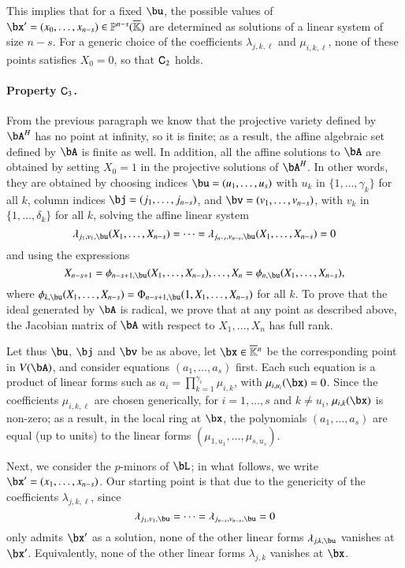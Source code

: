\documentclass[amsthm]{elsart}
\begin{document}
This implies that for a fixed $\bu$, the possible values of $\bx'=(x_0,\dots,x_{n-s}) \in \P^{n-s}(\KKbar)$ are
determined as solutions of a linear system of size $n-s$. For a
generic choice of the coefficients $\lambda_{j,k,\ell}$ and
$\mu_{i,k,\ell}$, none of these points satisfies $X_0=0$, so that
$\mathsf{C}_2$ holds.

\paragraph*{Property $\mathsf{C}_3$.} From the previous paragraph we know that
the projective variety defined by $\bA^\mH$ has no point at infinity,
so it is finite; as a result, the affine algebraic set defined by
$\bA$ is finite as well. In addition, all the affine solutions to
$\bA$ are obtained by setting $X_0=1$ in the projective solutions of
$\bA^\mH$. In other words, they are obtained by choosing indices
$\bu=(u_1,\dots,u_s)$ with $u_k$ in $\{1,\dots,\gamma_k\}$ for all $k$,
column indices $\bj=(j_1,\dots,j_{n-s})$, and
$\bv=(v_1,\dots,v_{n-s})$, with $v_k$ in $\{1,\dots,\delta_k\}$
for all $k$, solving the affine linear system
$$\lambda_{j_1,v_1,\bu}(X_1,\dots,X_{n-s})=\cdots=\lambda_{j_{n-s},v_{n-s},\bu}(X_1,\dots,X_{n-s})=0$$ 
and using the expressions
$$X_{n-s+1}=\phi_{n-s+1,\bu}(X_1,\dots,X_{n-s}),\dots,X_{n}=\phi_{n,\bu}(X_1,\dots,X_{n-s}),$$
where $\phi_{k,\bu}(X_1,\dots,X_{n-s})=\Phi_{n-s+1,\bu}(1,X_1,\dots,X_{n-s})$
for all $k$.
To prove that the ideal generated by $\bA$ is radical, we prove that
at any point as described above, the Jacobian matrix of $\bA$ with
respect to $X_1,\dots,X_n$ has full rank.

Let thus $\bu$, $\bj$ and $\bv$ be as above, let $\bx \in \KKbar{}^n$
be the corresponding point in $V(\bA)$, and consider equations
$(a_1,\dots,a_s)$ first. Each such equation is a product of linear forms
such as $a_i=\prod_{k=1}^{\gamma_i} \mu_{i,k}$, with $\mu_{i,u_i}(\bx)=0$.
Since the coefficients $\mu_{i,k,\ell}$ are chosen generically, for
$i=1,\dots,s$ and $k \ne u_i$, $\mu_{i,k}(\bx)$ is non-zero; as a
result, in the local ring at $\bx$, the polynomials $(a_1,\dots,a_s)$
are equal (up to units) to the linear forms
$(\mu_{1,u_1},\dots,\mu_{s,u_s})$.

Next, we consider the $p$-minors of $\bL$; in what follows, we 
write $\bx'=(x_1,\dots,x_{n-s})$. Our starting point is that due to 
the genericity of the coefficients $\lambda_{j,k,\ell}$, since 
$$\lambda_{j_1,v_1,\bu}=\cdots=\lambda_{j_{n-s},v_{n-s},\bu}=0$$
only admits $\bx'$ as a solution,
none of the other linear forms $\lambda_{j,k,\bu}$ vanishes at $\bx'$.
Equivalently, none of the other linear forms $\lambda_{j,k}$ vanishes at $\bx$.
\end{document}

